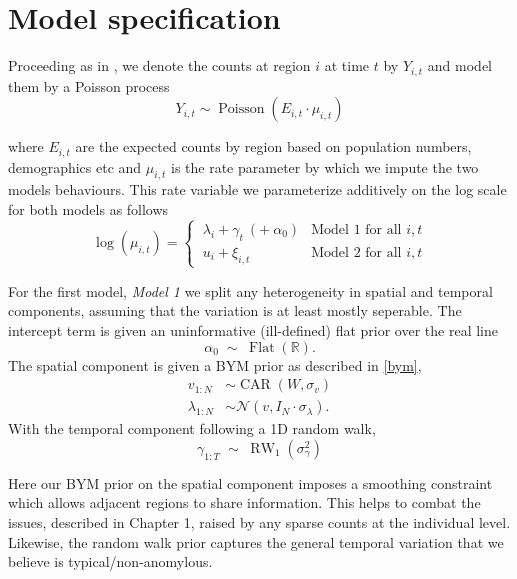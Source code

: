 \documentclass[11pt]{report}
\begin{document}
\section{Model specification}

Proceeding as in \citet{baystdetect}, we denote the counts at region $i$ at time $t$ by $Y_{i,t}$ and model them by a Poisson process
\begin{equation}
Y_{i,t} \sim \operatorname{Poisson}(E_{i,t} \cdot \mu_{i,t})
\end{equation}

where $E_{i,t}$ are the expected counts by region based on population numbers, demographics etc and $\mu_{i,t}$ is the rate parameter by which we impute the two models behaviours. This rate variable we parameterize additively on the log scale for both models as follows
\begin{equation}
\log{(\mu_{i,t})} = \begin{cases}
\ \lambda_{i} + \gamma_{t} \  (+ \  \alpha_0) & \textrm{Model 1 for all } i, t \\
\ u_{i} + \xi_{i,t} & \textrm{Model 2 for all } i, t
\end{cases}
\end{equation}

For the first model, \emph{Model 1} we split any heterogeneity in spatial and temporal components, assuming that the variation is at least mostly seperable. The intercept term is given an uninformative (ill-defined) flat prior over the real line
\begin{equation} \label{eq:intercept}
\alpha_0 \;\sim\; \operatorname{Flat}(\mathbb{R}).
\end{equation}
The spatial component is given a BYM prior as described in \ref{bym},
\begin{align}
v_{1:N} &\sim \operatorname{CAR}(W, \sigma_v) \\
\lambda_{1:N} &\sim \mathcal{N}(v, I_N \cdot \sigma_\lambda).
\end{align}
With the temporal component following a 1D random walk,
\begin{equation*}
\gamma_{1:T} \;\sim\; \operatorname{RW}_1(\sigma_\gamma^2)
\end{equation*}

Here our BYM prior on the spatial component imposes a smoothing constraint which allows adjacent regions to share information. This helps to combat the issues, described in Chapter 1, raised by any sparse counts at the individual level. Likewise, the random walk prior captures the general temporal variation that we believe is typical/non-anomylous. \\
\end{document}
